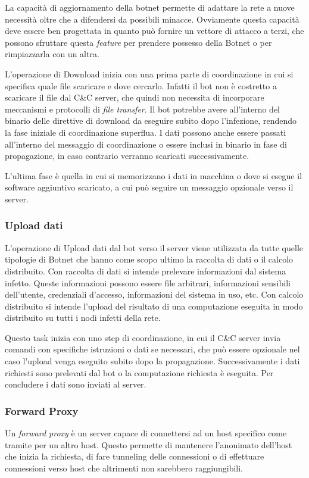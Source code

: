 La capacità di aggiornamento della botnet permette di adattare la rete a nuove necessità oltre che a difendersi da possibili minacce. Ovviamente questa capacità deve essere ben progettata in quanto può fornire un vettore di attacco a terzi, che possono sfruttare questa \textit{feature} per prendere possesso della Botnet o per rimpiazzarla con un altra.

L'operazione di Download inizia con una prima parte di coordinazione in cui si specifica quale file scaricare e dove cercarlo. Infatti il bot non è costretto a scaricare il file dal C\&C server, che quindi non necessita di incorporare meccanismi e protocolli di \textit{file transfer}. Il bot potrebbe avere all'interno del binario delle direttive di download da eseguire subito dopo l'infezione, rendendo la fase iniziale di coordinazione  superflua.
I dati possono anche essere passati all'interno del messaggio di coordinazione o essere inclusi in binario in fase di propagazione, in caso contrario verranno scaricati successivamente.

L'ultima fase è quella in cui si memorizzano i dati in macchina o dove si esegue il software aggiuntivo scaricato, a cui può seguire un messaggio opzionale verso il server.

\subsubsection{Upload dati}
L'operazione di Upload dati dal bot verso il server viene utilizzata da tutte quelle tipologie di Botnet che hanno come scopo ultimo la raccolta di dati o il calcolo distribuito.
Con raccolta di dati si intende prelevare informazioni dal sistema infetto. Queste informazioni possono essere file arbitrari, informazioni sensibili dell'utente, credenziali d'accesso, informazioni del sistema in uso, etc.
Con calcolo distribuito si intende l'upload del risultato di una computazione eseguita in modo distribuito su tutti i nodi infetti della rete.

Questo task inizia con uno step di coordinazione, in cui il C\&C server invia comandi con specifiche istruzioni o dati se necessari, che può essere opzionale nel caso l'upload venga eseguito subito dopo la propagazione. 
Successivamente i dati richiesti sono prelevati dal bot o la computazione richiesta è eseguita. 
Per concludere i dati sono inviati al server.
\subsubsection{Forward Proxy}
Un \emph{forward proxy} è un server capace di connettersi ad un  host specifico come tramite per un altro host.
Questo permette di mantenere l'anonimato dell'host che inizia la richiesta, di fare tunneling  delle connessioni o di effettuare connessioni verso host che altrimenti non sarebbero raggiungibili.

